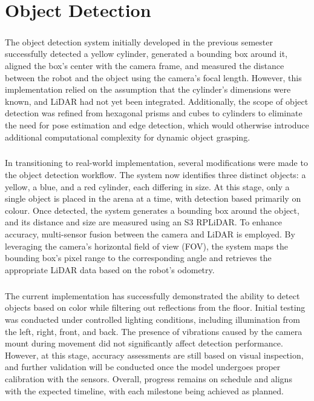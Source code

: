 \chapter{Object Detection}

\paragraph*{}
The object detection system initially developed in the previous semester successfully detected a yellow cylinder, generated a bounding box around it, aligned the box’s center with the camera frame, and measured the distance between the robot and the object using the camera’s focal length. However, this implementation relied on the assumption that the cylinder’s dimensions were known, and LiDAR had not yet been integrated. Additionally, the scope of object detection was refined from hexagonal prisms and cubes to cylinders to eliminate the need for pose estimation and edge detection, which would otherwise introduce additional computational complexity for dynamic object grasping.

\paragraph*{}
In transitioning to real-world implementation, several modifications were made to the object detection workflow. The system now identifies three distinct objects: a yellow, a blue, and a red cylinder, each differing in size. At this stage, only a single object is placed in the arena at a time, with detection based primarily on colour. Once detected, the system generates a bounding box around the object, and its distance and size are measured using an S3 RPLiDAR. To enhance accuracy, multi-sensor fusion between the camera and LiDAR is employed. By leveraging the camera’s horizontal field of view (FOV), the system maps the bounding box’s pixel range to the corresponding angle and retrieves the appropriate LiDAR data based on the robot’s odometry.

\paragraph*{}
The current implementation has successfully demonstrated the ability to detect objects based on color while filtering out reflections from the floor. Initial testing was conducted under controlled lighting conditions, including illumination from the left, right, front, and back. The presence of vibrations caused by the camera mount during movement did not significantly affect detection performance. However, at this stage, accuracy assessments are still based on visual inspection, and further validation will be conducted once the model undergoes proper calibration with the sensors. Overall, progress remains on schedule and aligns with the expected timeline, with each milestone being achieved as planned.

